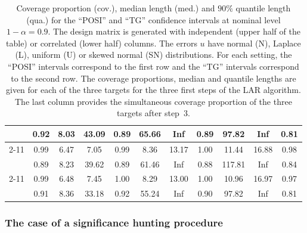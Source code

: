 \documentclass[preprint]{imsart}
\numberwithin{equation}{section}
\begin{document}
\begin{table}[h]
\begin{center}
\begin{tabular}{c|ccc|ccc|ccc|c}
& 0.92 & 8.03 & 43.09 & 0.89 & 65.66 & Inf & 0.89 & 97.82 & Inf & 0.81 \\ \cline{2-11}
\multirow{2}{*}{U}  & 0.99 & 6.47 & 7.05 & 0.99 & 8.36 & 13.17 & 1.00 & 11.44 & 16.88 & 0.98\\
& 0.89 & 8.23 & 39.62 & 0.89 & 61.46 & Inf & 0.88 & 117.81 & Inf & 0.84\\ \cline{2-11}
\multirow{2}{*}{SN}  & 0.99 & 6.48 & 7.45 & 1.00 & 8.29 & 13.00 & 1.00 & 10.96 & 16.97 & 0.97 \\
& 0.91 & 8.36 & 33.18 & 0.92 & 55.24 & Inf & 0.90 & 97.82 & Inf & 0.81 \\ 
\end{tabular}%
\end{center}
\caption{Coverage proportion (cov.), median length (med.) and $90 \%$ quantile length (qua.) for the ``POSI'' and ``TG'' confidence intervals at nominal level $1-\alpha=0.9$. The design matrix is generated with independent (upper half of the table) or correlated (lower half) columns. The errors $u$ have normal (N), Laplace (L), uniform (U) or skewed normal (SN) distributions. For each setting, the ``POSI'' intervals correspond to the first row and the ``TG'' intervals correspond to the second row. The coverage proportions, median and quantile lengths are given for each of the three targets for the three first steps of the LAR algorithm. The last column provides the simultaneous coverage proportion of the three targets after step~3.}
\label{table:homolm}
\end{table}
 

\subsubsection{The case of a significance hunting procedure} \label{section:holm:significance:hunting}
\end{document}
